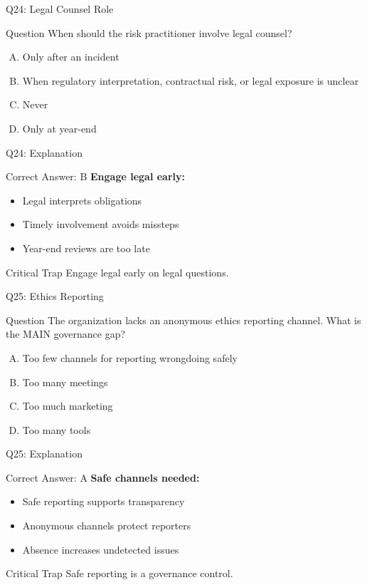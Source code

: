 \documentclass{beamer}
\begin{document}
	\begin{frame}{Q24: Legal Counsel Role}
		\begin{block}{Question}
			When should the risk practitioner involve legal counsel?
		\end{block}
		\begin{enumerate}[(A)]
			\item Only after an incident
			\item When regulatory interpretation, contractual risk, or legal exposure is unclear
			\item Never
			\item Only at year-end
		\end{enumerate}
	\end{frame}
	
	\begin{frame}{Q24: Explanation}
		\begin{block}{Correct Answer: B}
			\textbf{Engage legal early:}
			\begin{itemize}
				\item Legal interprets obligations
				\item Timely involvement avoids missteps
				\item Year-end reviews are too late
			\end{itemize}
		\end{block}
		\begin{alertblock}{Critical Trap}
			Engage legal early on legal questions.
		\end{alertblock}
	\end{frame}
	
	\begin{frame}{Q25: Ethics Reporting}
		\begin{block}{Question}
			The organization lacks an anonymous ethics reporting channel. What is the MAIN governance gap?
		\end{block}
		\begin{enumerate}[(A)]
			\item Too few channels for reporting wrongdoing safely
			\item Too many meetings
			\item Too much marketing
			\item Too many tools
		\end{enumerate}
	\end{frame}
	
	\begin{frame}{Q25: Explanation}
		\begin{block}{Correct Answer: A}
			\textbf{Safe channels needed:}
			\begin{itemize}
				\item Safe reporting supports transparency
				\item Anonymous channels protect reporters
				\item Absence increases undetected issues
			\end{itemize}
		\end{block}
		\begin{alertblock}{Critical Trap}
			Safe reporting is a governance control.
		\end{alertblock}
	\end{frame}
	
\end{document}
